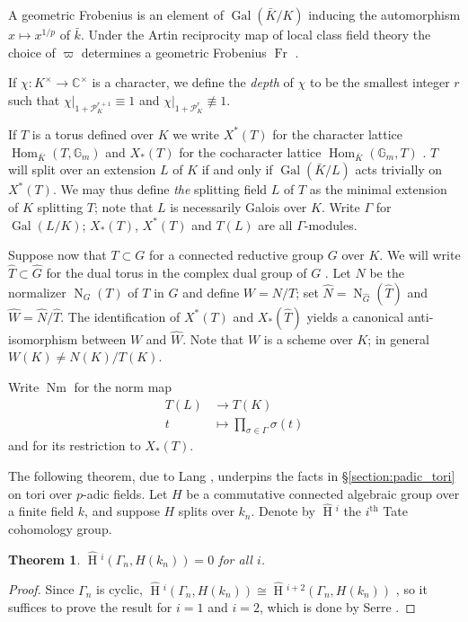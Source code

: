 \documentclass[11pt]{amsart}
\theoremstyle{plain}
\newtheorem{theorem}{Theorem}[section]
\newcommand{\HT}[1]{\hat{\HH}{}^{#1}}
\theoremstyle{definition}
\DeclareMathOperator{\Gal}{Gal}
\DeclareMathOperator{\HH}{H}
\DeclareMathOperator{\Nm}{Nm}
\DeclareMathOperator{\Hom}{Hom}
\DeclareMathOperator{\Fr}{Fr}
\newcommand{\PK}{\mathcal{P}_K}
\newcommand{\Gm}{\mathbb{G}_m}
\newcommand{\Normalizer}[2]{\operatorname{N}_{#2}(#1)}
\begin{document}
A geometric Frobenius is an element of $\Gal(\bar{K}/K)$
inducing the automorphism $x \mapsto x^{1/p}$ of $\bar{k}$.  Under the
Artin reciprocity map of local class field theory the choice of $\varpi$
determines a geometric Frobenius $\Fr$ \cite[\S 2]{serre:LocalClassFieldThy}.

If $\chi : K^{\times} \rightarrow \mathbb{C}^{\times}$ is a character, we define
the \emph{depth} of $\chi$ to be the smallest integer $r$ such that
$\chi|_{1 + \PK^{r+1}} \equiv 1$ and
$\chi|_{1 + \PK^{r}} \not\equiv 1$.

If $T$ is a torus defined over $K$ we write $X^*(T)$
for the character lattice $\Hom_{\bar{K}}(T, \Gm)$ and $X_*(T)$ for the
cocharacter lattice $\Hom_{\bar{K}}(\Gm, T)$ \cite[\S 16.2]{humphreys:LinAlgGrps}.
$T$ will split over an extension
$L$ of $K$ if and only if $\Gal(\bar{K}/L)$ acts trivially on $X^*(T)$.
We may thus define \emph{the} splitting field $L$ of $T$ as the
minimal extension of $K$ splitting $T$; note that $L$ is necessarily
Galois over $K$.  Write $\Gamma$ for $\Gal(L/K)$; $X_*(T)$, $X^*(T)$ and $T(L)$
are all $\Gamma$-modules.

Suppose now that $T \subset G$ for a connected reductive group $G$ over $K$.
We will write $\hat{T} \subset \hat{G}$ for the dual torus in the complex dual group of $G$ \cite[\S I.2]{borel:79a}.
Let $N$ be the normalizer $\Normalizer{T}{G}$ of $T$ in $G$ and define $W = N/T$;
set $\hat{N} = \Normalizer{\hat{T}}{\hat{G}}$ and
$\hat{W} = \hat{N}/\hat{T}$.  The identification of $X^*(T)$ and $X_*(\hat{T})$
yields a canonical anti-isomorphism between $W$ and $\hat{W}$.
Note that $W$ is a scheme over $K$; in general $W(K) \ne N(K) / T(K)$.

Write $\Nm$ for the norm map
\begin{align*}
T(L) &\rightarrow T(K) \\
t &\mapsto \prod_{\sigma \in \Gamma} \sigma(t)
\end{align*}
and for its restriction to $X_*(T)$.

The following theorem, due to Lang \cite{lang:56a}, underpins the facts in
\S\ref{section:padic_tori} on tori over $p$-adic fields.
Let $H$ be a commutative connected algebraic group over a
finite field $k$, and suppose $H$ splits over $k_n$.  Denote by $\HT{i}$ the $i^{\mathrm{th}}$
Tate cohomology group.

\begin{theorem} \label{thm:lang}
$\HT{i}(\Gamma_n, H(k_n)) = 0$ for all $i$.
\end{theorem}
\begin{proof}
Since $\Gamma_n$ is cyclic,
$\HT{i}(\Gamma_n, H(k_n)) \cong \HT{i+2}(\Gamma_n, H(k_n))$ \cite[Thm. 5]{atiyah-wall:CohomologyGrps},
so it suffices to prove the result for $i=1$ and $i=2$, which is done
by Serre \cite[\S VI.6]{serre:AlgGrpsClassFields}.
\end{proof}
\end{document}
